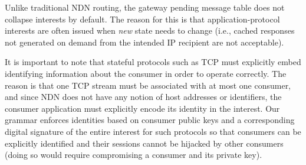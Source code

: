 Unlike traditional NDN routing, the gateway pending message table does not collapse interests by default. The reason for this is that application-protocol interests are often issued when \emph{new} state needs to change (i.e., cached responses not generated on demand from the intended IP recipient are not acceptable). 

It is important to note that stateful protocols such as TCP must explicitly embed identifying information about the consumer in order to operate correctly. The reason is that one TCP stream must be associated with at most one consumer, and since NDN does not have any notion of host addresses or identifiers, the consumer application must explicitly encode its identity in the interest. Our grammar enforces identities based on consumer public keys and a corresponding digital signature of the entire interest for such protocols so that consumers can be explicitly identified and their sessions cannot be hijacked by other consumers (doing so would require compromising a consumer and its private key).

